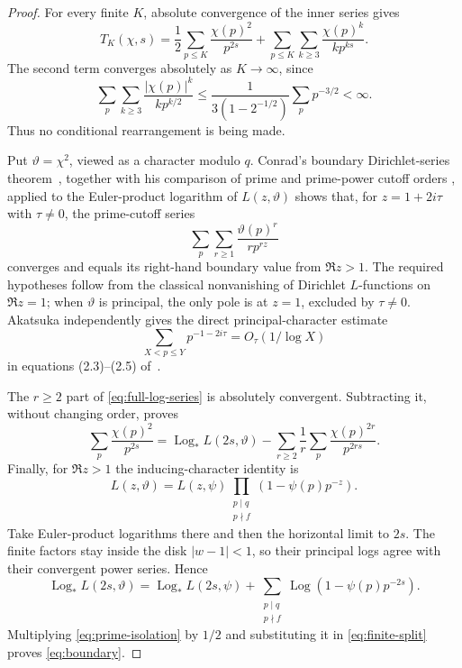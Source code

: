 \documentclass[11pt]{article}
\DeclareMathOperator{\Log}{Log}
\begin{document}
\begin{proof}
For every finite $K$, absolute convergence of the inner series gives
\begin{equation}\label{eq:finite-split}
 T_K(\chi,s)=\frac12\sum_{p\le K}\frac{\chi(p)^2}{p^{2s}}
 +\sum_{p\le K}\sum_{k\ge3}\frac{\chi(p)^k}{k p^{ks}}.
\end{equation}
The second term converges absolutely as $K\to\infty$, since
\[
 \sum_p\sum_{k\ge3}\frac{|\chi(p)|^k}{k p^{k/2}}
 \le \frac1{3(1-2^{-1/2})}\sum_p p^{-3/2}<\infty.
\]
Thus no conditional rearrangement is being made.

Put $\vartheta=\chi^2$, viewed as a character modulo $q$.  Conrad's
boundary Dirichlet-series theorem~\cite[Theorem~4.1]{Conrad2005PartialEuler},
together with his comparison of prime and prime-power cutoff orders
\cite[Lemma~3.1]{Conrad2005PartialEuler}, applied to the Euler-product
logarithm of $L(z,\vartheta)$ shows that, for $z=1+2i\tau$ with
$\tau\ne0$, the prime-cutoff series
\begin{equation}\label{eq:full-log-series}
 \sum_p\sum_{r\ge1}\frac{\vartheta(p)^r}{r p^{rz}}
\end{equation}
converges and equals its right-hand boundary value from $\Re z>1$.
The required hypotheses follow from the classical nonvanishing of Dirichlet
$L$-functions on $\Re z=1$; when $\vartheta$ is principal, the only pole is
at $z=1$, excluded by $\tau\ne0$.  Akatsuka independently gives the direct
principal-character estimate
\begin{equation}\label{eq:akatsuka-tail}
 \sum_{X<p\le Y}p^{-1-2i\tau}=O_\tau(1/\log X)
\end{equation}
in equations (2.3)--(2.5) of~\cite{Akatsuka2017EulerProduct}.

The $r\ge2$ part of \eqref{eq:full-log-series} is absolutely convergent.
Subtracting it, without changing order, proves
\begin{equation}\label{eq:prime-isolation}
 \sum_p\frac{\chi(p)^2}{p^{2s}}
 =\Log_*L(2s,\vartheta)
  -\sum_{r\ge2}\frac1r\sum_p
       \frac{\chi(p)^{2r}}{p^{2rs}}.
\end{equation}
Finally, for $\Re z>1$ the inducing-character identity is
\[
 L(z,\vartheta)=L(z,\psi)
 \prod_{\substack{p\mid q\\p\nmid f}}(1-\psi(p)p^{-z}).
\]
Take Euler-product logarithms there and then the horizontal limit to $2s$.
The finite factors stay inside the disk $|w-1|<1$, so their principal logs
agree with their convergent power series.  Hence
\[
 \Log_*L(2s,\vartheta)=\Log_*L(2s,\psi)
 +\sum_{\substack{p\mid q\\p\nmid f}}
   \Log(1-\psi(p)p^{-2s}).
\]
Multiplying \eqref{eq:prime-isolation} by $1/2$ and substituting it in
\eqref{eq:finite-split} proves \eqref{eq:boundary}.
\end{proof}
\end{document}
